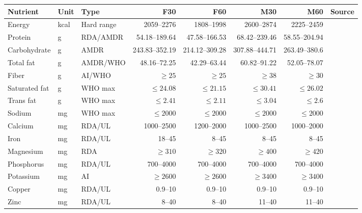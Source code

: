 \begin{tabularx}{\textwidth}{lllrrrrX}
\toprule
Nutrient & Unit & Type & F30 & F60 & M30 & M60 & Source \\
\midrule
Energy & kcal & Hard range & 2059--2276 & 1808--1998 & 2600--2874 & 2225--2459 & \cite{nases2023energy} \\
\midrule
Protein & g & RDA/AMDR & 54.18--189.64 & 47.58--166.53 & 68.42--239.46 & 58.55--204.94 & \cite{healthcanada2025macronutrients} \\
\midrule
Carbohydrate & g & AMDR & 243.83--352.19 & 214.12--309.28 & 307.88--444.71 & 263.49--380.6 & \cite{healthcanada2025macronutrients} \\
\midrule
Total fat & g & AMDR/WHO & 48.16--72.25 & 42.29--63.44 & 60.82--91.22 & 52.05--78.07 & \cite{healthcanada2025macronutrients,who2023fatsupdate} \\
\midrule
Fiber & g & AI/WHO & $\geq 25$ & $\geq 25$ & $\geq 38$ & $\geq 30$ & \cite{healthcanada2025macronutrients,who2023fatsupdate} \\
\midrule
Saturated fat & g & WHO max & $\leq 24.08$ & $\leq 21.15$ & $\leq 30.41$ & $\leq 26.02$ & \cite{who2023fatsupdate} \\
\midrule
Trans fat & g & WHO max & $\leq 2.41$ & $\leq 2.11$ & $\leq 3.04$ & $\leq 2.6$ & \cite{who2023fatsupdate} \\
\midrule
Sodium & mg & WHO max & $\leq 2000$ & $\leq 2000$ & $\leq 2000$ & $\leq 2000$ & \cite{who2012sodium} \\
\midrule
Calcium & mg & RDA/UL & 1000--2500 & 1200--2000 & 1000--2500 & 1000--2000 & \cite{healthcanada2025elements} \\
\midrule
Iron & mg & RDA/UL & 18--45 & 8--45 & 8--45 & 8--45 & \cite{healthcanada2025elements} \\
\midrule
Magnesium & mg & RDA & $\geq 310$ & $\geq 320$ & $\geq 400$ & $\geq 420$ & \cite{healthcanada2025elements} \\
\midrule
Phosphorus & mg & RDA/UL & 700--4000 & 700--4000 & 700--4000 & 700--4000 & \cite{healthcanada2025elements} \\
\midrule
Potassium & mg & AI & $\geq 2600$ & $\geq 2600$ & $\geq 3400$ & $\geq 3400$ & \cite{healthcanada2025elements} \\
\midrule
Copper & mg & RDA/UL & 0.9--10 & 0.9--10 & 0.9--10 & 0.9--10 & \cite{healthcanada2025elements} \\
\midrule
Zinc & mg & RDA/UL & 8--40 & 8--40 & 11--40 & 11--40 & \cite{healthcanada2025elements} \\

\end{tabularx}
